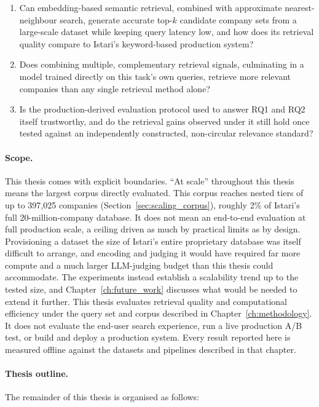 \documentclass[a4paper,oneside,bibliography=totoc]{scrbook}
\begin{document}
\begin{enumerate}
\item[\textbf{RQ1}] Can embedding-based semantic retrieval, combined with approximate nearest-neighbour search, generate accurate top-$k$ candidate company sets from a large-scale dataset while keeping query latency low, and how does its retrieval quality compare to Istari's keyword-based production system?
\item[\textbf{RQ2}] Does combining multiple, complementary retrieval signals, culminating in a model trained directly on this task's own queries, retrieve more relevant companies than any single retrieval method alone?
\item[\textbf{RQ3}] Is the production-derived evaluation protocol used to answer RQ1 and RQ2 itself trustworthy, and do the retrieval gains observed under it still hold once tested against an independently constructed, non-circular relevance standard?
\end{enumerate}

\paragraph{Scope.} This thesis comes with explicit boundaries. ``At scale'' throughout this thesis means the largest corpus directly evaluated. This corpus reaches nested tiers of up to 397,025 companies (Section~\ref{sec:scaling_corpus}), roughly 2\% of Istari's full 20-million-company database. It does not mean an end-to-end evaluation at full production scale, a ceiling driven as much by practical limits as by design. Provisioning a dataset the size of Istari's entire proprietary database was itself difficult to arrange, and encoding and judging it would have required far more compute and a much larger LLM-judging budget than this thesis could accommodate. The experiments instead establish a scalability trend up to the tested size, and Chapter~\ref{ch:future_work} discusses what would be needed to extend it further. This thesis evaluates retrieval quality and computational efficiency under the query set and corpus described in Chapter~\ref{ch:methodology}. It does not evaluate the end-user search experience, run a live production A/B test, or build and deploy a production system. Every result reported here is measured offline against the datasets and pipelines described in that chapter.

\paragraph{Thesis outline.} The remainder of this thesis is organised as follows:
\end{document}
